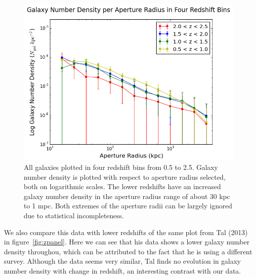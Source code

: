 \documentclass[apj]{emulateapj}
\begin{document}
\begin{figure}
\centering
\graphicspath{{C:/3d_hst/2015_finals/aperture_distance/}}
\includegraphics[width=\linewidth]{temp_z_final}
\caption{\footnotesize All galaxies plotted in four redshift bins from 0.5 to 2.5. Galaxy number density is plotted with respect to aperture radius selected, both on logarithmic scales.  The lower redshifts have an increased galaxy number density in the aperture radius range of about 30 kpc to 1 mpc. Both extremes of the aperture radii can be largely ignored due to statistical incompleteness.}
\label{fig:z}
\end{figure}

We also compare this data with lower redshifts of the same plot from Tal (2013)~\cite{2013ApJ...769...31T} in figure~\ref{fig:zpanel}. Here we can see that his data shows a lower galaxy number density throughou, which can be attributed to the fact that he is using a different survey. Although the data seems very similar, Tal finds no evolution in galaxy number density with change in redshift, an interesting contrast with our data. 
\end{document}
